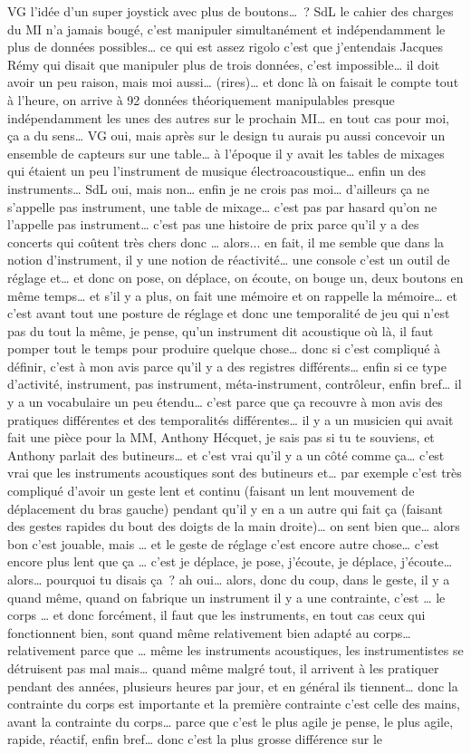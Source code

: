 VG l'idée d'un super joystick avec plus de boutons… ? 
SdL le cahier des charges du MI n'a jamais bougé, c'est manipuler simultanément et indépendamment le plus de données possibles… ce qui est assez rigolo c'est que j'entendais Jacques Rémy qui disait que manipuler plus de trois données, c'est impossible… il doit avoir un peu raison, mais moi aussi… (rires)… et donc là on faisait le compte tout à l'heure, on arrive à 92 données théoriquement manipulables presque indépendamment les unes des autres sur le prochain MI… en tout cas pour moi, ça a du sens…  
VG oui, mais après sur le design tu aurais pu aussi concevoir un ensemble de capteurs sur une table… à l'époque il y avait les tables de mixages qui étaient un peu l'instrument de musique électroacoustique… enfin un des instruments… 
SdL oui, mais non… enfin je ne crois pas moi… d'ailleurs ça ne s'appelle pas instrument, une table de mixage… c'est pas par hasard qu'on ne l'appelle pas instrument… c'est pas une histoire de prix parce qu'il y a des concerts qui coûtent très chers donc … alors... en fait, il me semble que dans la notion d'instrument, il y une notion de réactivité… une console c'est un outil de réglage et… et donc on pose, on déplace,  on écoute, on bouge un, deux boutons en même temps… et s'il y a plus, on fait une mémoire et on rappelle la mémoire… et c'est avant tout une posture de réglage et donc une temporalité de jeu qui n'est pas du tout la même, je pense, qu'un instrument dit acoustique où là, il faut pomper tout le temps pour produire quelque chose… donc si c'est compliqué à définir, c'est à mon avis parce qu'il y a des registres différents… enfin si ce type d'activité, instrument, pas instrument, méta-instrument, contrôleur, enfin bref… il y a un vocabulaire un peu étendu… c'est parce que ça recouvre à mon avis des pratiques différentes et des temporalités différentes… il y a un musicien qui avait fait une pièce pour la MM, Anthony Hécquet, je sais pas si tu te souviens, et Anthony parlait des butineurs… et c'est vrai qu'il y a un côté comme ça… c'est vrai que les instruments acoustiques sont des butineurs et… par exemple c'est très compliqué d'avoir un geste lent et continu (faisant un lent mouvement de déplacement du bras gauche) pendant qu'il y en a un autre qui fait ça (faisant des gestes rapides du bout des doigts de la main droite)… on sent bien que… alors bon c'est jouable, mais … et le geste de réglage c'est encore autre chose… c'est encore plus lent que ça … c'est je déplace, je pose, j'écoute, je déplace, j'écoute… alors… pourquoi tu disais ça ? ah oui… alors, donc du coup, dans le geste, il y a quand même, quand on fabrique un instrument il y a une contrainte, c'est … le corps … et donc forcément, il faut que les instruments, en tout cas ceux qui fonctionnent bien, sont quand même relativement bien adapté au corps… relativement parce que … même les instruments acoustiques, les instrumentistes se détruisent pas mal mais… quand même malgré tout, il arrivent à les pratiquer pendant des années, plusieurs heures par jour, et en général ils tiennent… donc la contrainte du corps est importante et la première contrainte c'est celle des mains, avant la contrainte du corps… parce que c'est le plus agile je pense, le plus agile, rapide, réactif, enfin bref… donc c'est la plus grosse différence sur le 